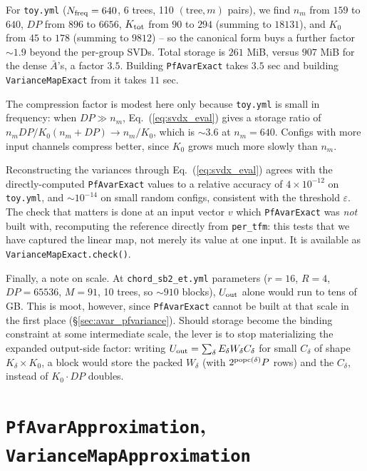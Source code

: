 \documentclass{article}
\numberwithin{equation}{section}   %
\begin{document}
For {\tt toy.yml} ($N_{\rm freq} = 640$, 6 trees, 110 $(\mbox{tree},m)$ pairs), we find
$n_m$ from $159$ to $640$, $DP$ from $896$ to $6656$, $K_{\rm tot}$ from $90$ to $294$ (summing
to $18131$), and $K_0$ from $45$ to $178$ (summing to $9812$) -- so the canonical form buys a
further factor $\sim\!1.9$ beyond the per-group SVDs. Total storage is $261$ MiB, versus $907$
MiB for the dense $\bar A$'s, a factor $3.5$. Building {\tt PfAvarExact} takes $3.5$ sec and
building {\tt VarianceMapExact} from it takes $11$ sec.

The compression factor is modest here only because {\tt toy.yml} is small in frequency: when
$DP \gg n_m$, Eq.\ (\ref{eq:svdx_eval}) gives a storage ratio of $n_m DP / K_0(n_m + DP) \to
n_m / K_0$, which is $\sim\!3.6$ at $n_m = 640$. Configs with more input channels compress
better, since $K_0$ grows much more slowly than $n_m$.

Reconstructing the variances through Eq.\ (\ref{eq:svdx_eval}) agrees with the directly-computed
{\tt PfAvarExact} values to a relative accuracy of $4 \times 10^{-12}$ on {\tt toy.yml}, and
$\sim\!10^{-14}$ on small random configs, consistent with the threshold $\varepsilon$. The check
that matters is done at an input vector $v$ which {\tt PfAvarExact} was {\em not} built with,
recomputing the reference directly from {\tt per\_tfm}: this tests that we have captured the
linear map, not merely its value at one input. It is available as
{\tt VarianceMapExact.check()}.

Finally, a note on scale. At {\tt chord\_sb2\_et.yml} parameters ($r = 16$, $R = 4$,
$DP = 65536$, $M = 91$, 10 trees, so $\sim\!910$ blocks), $U_{\rm out}$ alone would run to tens
of GB. This is moot, however, since {\tt PfAvarExact} cannot be built at that scale in the first
place (\S\ref{sec:avar_pfvariance}). Should storage become the binding constraint at some
intermediate scale, the lever is to stop materializing the expanded output-side factor: writing
$U_{\rm out} = \sum_\delta E_\delta W_\delta C_\delta$ for small $C_\delta$ of shape
$K_\delta \times K_0$, a block would store the packed $W_\delta$ (with $2^{{\rm popc}(\delta)}P$
rows) and the $C_\delta$, instead of $K_0 \cdot DP$ doubles.

\clearpage

\section{{\tt PfAvarApproximation}, {\tt VarianceMapApproximation}}
\label{sec:variance_svd}
\end{document}
